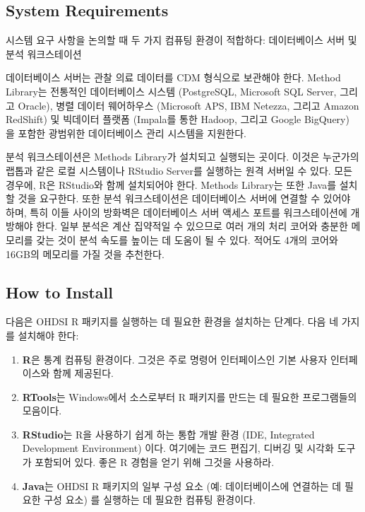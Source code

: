 \documentclass[11pt]{book}
\providecommand{\tightlist}{%
  \setlength{\itemsep}{0pt}\setlength{\parskip}{0pt}}
\theoremstyle{definition}
\theoremstyle{definition}
\theoremstyle{definition}
\theoremstyle{remark}
\begin{document}
\subsection{System Requirements}\label{system-requirements}

시스템 요구 사항을 논의할 때 두 가지 컴퓨팅 환경이 적합하다:
데이터베이스 서버 및 분석 워크스테이션 

데이터베이스 서버는 관찰 의료 데이터를 CDM 형식으로 보관해야 한다.
Method Library는 전통적인 데이터베이스 시스템 (PostgreSQL, Microsoft SQL
Server, 그리고 Oracle), 병렬 데이터 웨어하우스 (Microsoft APS, IBM
Netezza, 그리고 Amazon RedShift) 및 빅데이터 플랫폼 (Impala를 통한
Hadoop, 그리고 Google BigQuery) 을 포함한 광범위한 데이터베이스 관리
시스템을 지원한다.

분석 워크스테이션은 Methods Library가 설치되고 실행되는 곳이다. 이것은
누군가의 랩톱과 같은 로컬 시스템이나 RStudio Server를 실행하는 원격
서버일 수 있다. 모든 경우에, R은 RStudio와 함께 설치되어야 한다. Methods
Library는 또한 Java를 설치할 것을 요구한다. 또한 분석 워크스테이션은
데이터베이스 서버에 연결할 수 있어야 하며, 특히 이들 사이의 방화벽은
데이터베이스 서버 액세스 포트를 워크스테이션에 개방해야 한다. 일부
분석은 계산 집약적일 수 있으므로 여러 개의 처리 코어와 충분한 메모리를
갖는 것이 분석 속도를 높이는 데 도움이 될 수 있다. 적어도 4개의 코어와
16GB의 메모리를 가질 것을 추천한다.

\subsection{How to Install}\label{installR}

다음은 OHDSI R 패키지를 실행하는 데 필요한 환경을 설치하는 단계다. 다음
네 가지를 설치해야 한다: 

\begin{enumerate}
\def\labelenumi{\arabic{enumi}.}
\tightlist
\item
  \textbf{R}은 통계 컴퓨팅 환경이다. 그것은 주로 명령어 인터페이스인
  기본 사용자 인터페이스와 함께 제공된다.
\item
  \textbf{RTools}는 Windows에서 소스로부터 R 패키지를 만드는 데 필요한
  프로그램들의 모음이다.
\item
  \textbf{RStudio}는 R을 사용하기 쉽게 하는 통합 개발 환경 (IDE,
  Integrated Development Environment) 이다. 여기에는 코드 편집기, 디버깅
  및 시각화 도구가 포함되어 있다. 좋은 R 경험을 얻기 위해 그것을
  사용하라.
\item
  \textbf{Java}는 OHDSI R 패키지의 일부 구성 요소 (예: 데이터베이스에
  연결하는 데 필요한 구성 요소) 를 실행하는 데 필요한 컴퓨팅 환경이다.
\end{enumerate}
\end{document}
